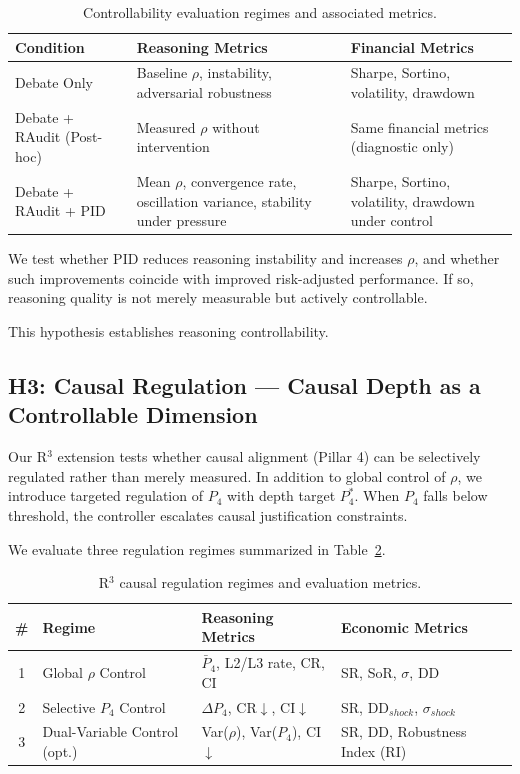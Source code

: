 \documentclass{article}
\begin{document}
\begin{table}[h]
\centering
\small
\begin{tabular}{l p{3.6cm} p{3.6cm}}
\hline
\textbf{Condition} & \textbf{Reasoning Metrics} & \textbf{Financial Metrics} \\
\hline
Debate Only 
& Baseline $\rho$, instability, adversarial robustness 
& Sharpe, Sortino, volatility, drawdown \\

Debate + RAudit (Post-hoc) 
& Measured $\rho$ without intervention 
& Same financial metrics (diagnostic only) \\

Debate + RAudit + PID 
& Mean $\rho$, convergence rate, oscillation variance, stability under pressure 
& Sharpe, Sortino, volatility, drawdown under control \\
\hline
\end{tabular}
\caption{Controllability evaluation regimes and associated metrics.}
\label{tab:h2}
\end{table}

We test whether PID reduces reasoning instability and increases $\rho$, and whether such improvements coincide with improved risk-adjusted performance. If so, reasoning quality is not merely measurable but actively controllable.

This hypothesis establishes reasoning controllability.

\subsection{H3: Causal Regulation — Causal Depth as a Controllable Dimension}

Our R$^3$ extension tests whether causal alignment (Pillar 4) can be selectively regulated rather than merely measured. In addition to global control of $\rho$, we introduce targeted regulation of $P_4$ with depth target $P_4^*$. When $P_4$ falls below threshold, the controller escalates causal justification constraints.

We evaluate three regulation regimes summarized in Table~\ref{tab:r3-regimes}.

\begin{table}[h]
\centering
\small
\begin{tabular}{@{}clll@{}}
\toprule
\textbf{\#} & \textbf{Regime} & \textbf{Reasoning Metrics} & \textbf{Economic Metrics} \\
\midrule
1 & Global $\rho$ Control 
& $\bar{P}_4$, L2/L3 rate, CR, CI 
& SR, SoR, $\sigma$, DD \\

2 & Selective $P_4$ Control 
& $\Delta P_4$, CR$\downarrow$, CI$\downarrow$ 
& SR, DD$_{shock}$, $\sigma_{shock}$ \\

3 & Dual-Variable Control (opt.) 
& Var($\rho$), Var($P_4$), CI$\downarrow$ 
& SR, DD, Robustness Index (RI) \\
\bottomrule
\end{tabular}
\vspace{4pt}
\caption{R$^3$ causal regulation regimes and evaluation metrics.}
\label{tab:r3-regimes}
\end{table}
\end{document}
